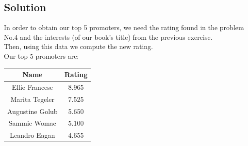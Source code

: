 \documentclass{article}
\begin{document}
  \vspace{3em}

  \subsection{Solution}
    In order to obtain our top 5 promoters, we need the rating found in the
    problem No.4 and the interests (of our book's title) from the previous
    exercise.\\
    Then, using this data we compute the new rating.\\
    Our top 5 promoters are:\\

    \vspace{2em}

    \begin{table}[H]
      \centering
      \begin{tabular}{|c|c|}
        \hline
        \textbf{Name} & \textbf{Rating} \\ \hline
        Ellie Francese  & 8.965 \\ \hline
        Marita Tegeler  & 7.525 \\ \hline
        Augustine Golub & 5.650 \\ \hline
        Sammie Womac    & 5.100 \\ \hline
        Leandro Eagan   & 4.655 \\ \hline
      \end{tabular}
    \end{table}
\end{document}
